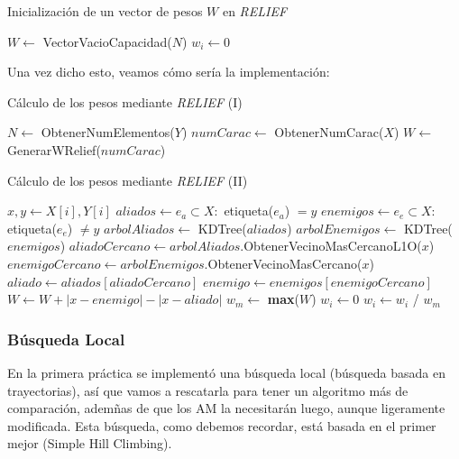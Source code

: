 \documentclass[11pt,a4paper]{article}
\begin{document}
\begin{algorithm}[H]
\caption{Inicialización de un vector de pesos $W$ en \textit{RELIEF}}
\begin{algorithmic}[1]
\State $W \gets$ VectorVacioCapacidad($N$)
	\State $w_i \gets 0$
\EndFor
\State {}
\EndFunction
\end{algorithmic}
\end{algorithm}

Una vez dicho esto, veamos cómo sería la implementación:

\begin{algorithm}[H]
\caption{Cálculo de los pesos mediante \textit{RELIEF} (I)}
\begin{algorithmic}[1]
\State $N \gets$ ObtenerNumElementos($Y$)
\State $numCarac \gets $ ObtenerNumCarac($X$)
\State $W \gets $ GenerarWRelief($numCarac$)
\end{algorithmic}
\end{algorithm}

\begin{algorithm}[H]
\caption{Cálculo de los pesos mediante \textit{RELIEF} (II)}
\begin{algorithmic}
	\State $x, y \gets X[i], Y[i]$
	\State $aliados \gets e_a \subset X :$ etiqueta($e_a$) $ = y$
	\State $enemigos \gets e_e \subset X:$ etiqueta($e_e$) $ \neq y$
	\State $arbolAliados \gets$ KDTree($aliados$)
	\State $arbolEnemigos \gets$ KDTree($enemigos$)
	\State $aliadoCercano \gets arbolAliados$.ObtenerVecinoMasCercanoL1O($x$)
	\State $enemigoCercano \gets arbolEnemigos$.ObtenerVecinoMasCercano($x$)
	\State $aliado \gets aliados[aliadoCercano]$
	\State $enemigo \gets enemigos[enemigoCercano]$
	\State $W \gets W + \left|x - enemigo\right| - \left|x - aliado\right|$
\EndFor
\State $w_m \gets$ \textbf{max}($W$)
		\State $w_i \gets 0$
	\Else
		\State $w_i \gets w_i$ / $w_m$
	\EndIf
\EndFor
\State {}
\EndFunction
\end{algorithmic}
\end{algorithm}

\newpage

\subsubsection{Búsqueda Local}
\label{subsubsect:ls}

En la primera práctica se implementó una búsqueda local (búsqueda basada en trayectorias), así que vamos a rescatarla para
tener un algoritmo más de comparación, ademñas de que los AM la necesitarán luego, aunque ligeramente modificada. Esta búsqueda,
como debemos recordar, está basada en el primer mejor (Simple Hill Climbing).
\end{document}
